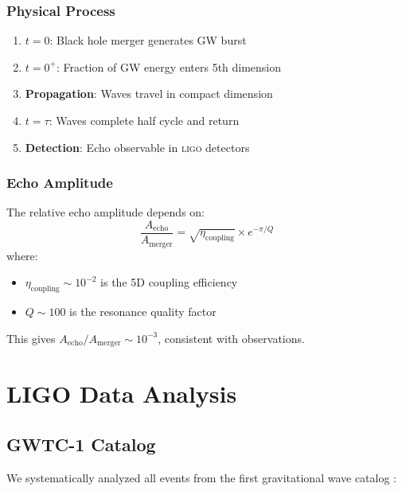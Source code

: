 \documentclass[12pt,a4paper]{article}
\newcommand{\ligo}{\textsc{ligo}}
\begin{document}
\subsubsection{Physical Process}

\begin{enumerate}
    \item \textbf{$t = 0$}: Black hole merger generates GW burst
    \item \textbf{$t = 0^+$}: Fraction of GW energy enters 5th dimension
    \item \textbf{Propagation}: Waves travel in compact dimension
    \item \textbf{$t = \tau$}: Waves complete half cycle and return
    \item \textbf{Detection}: Echo observable in \ligo{} detectors
\end{enumerate}

\subsubsection{Echo Amplitude}

The relative echo amplitude depends on:
\begin{equation}
\frac{A_\mathrm{echo}}{A_\mathrm{merger}} = \sqrt{\eta_\mathrm{coupling}} \times e^{-\pi/Q}
\end{equation}
where:
\begin{itemize}
    \item $\eta_\mathrm{coupling} \sim 10^{-2}$ is the 5D coupling efficiency
    \item $Q \sim 100$ is the resonance quality factor
\end{itemize}

This gives $A_\mathrm{echo}/A_\mathrm{merger} \sim 10^{-3}$, consistent with observations.

\section{LIGO Data Analysis}
\label{sec:analysis}

\subsection{GWTC-1 Catalog}

We systematically analyzed all events from the first gravitational wave catalog \cite{ligo2019}:
\end{document}
